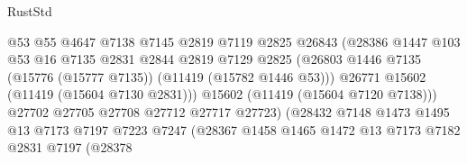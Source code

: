 \begin{lexlean}{RustStd}
\begin{coremodule}
                                        @53
                                        @55
                                        @4647
                                        @7138
                                        @7145
                                        @2819
                                        @7119
                                        @2825
                                        @26843
                                        (@28386
                                          @1447
                                          @103
                                          @53
                                          @16
                                          @7135
                                          @2831
                                          @2844
                                          @2819
                                          @7129
                                          @2825
                                          (@26803
                                            @1446
                                            @7135
                                            (@15776 (@15777 @7135))
                                            (@11419 (@15782 @1446 @53)))
                                          @26771
                                          @15602
                                          (@11419 (@15604 @7130 @2831)))
                                        @15602
                                        (@11419 (@15604 @7120 @7138)))
                                      @27702
                                      @27705
                                      @27708
                                      @27712
                                      @27717
                                      @27723)
                                    (@28432
                                      @7148
                                      @1473
                                      @1495
                                      @13
                                      @7173
                                      @7197
                                      @7223
                                      @7247
                                      (@28367
                                        @1458
                                        @1465
                                        @1472
                                        @13
                                        @7173
                                        @7182
                                        @2831
                                        @7197
                                        (@28378

\end{coremodule}
\end{lexlean}
